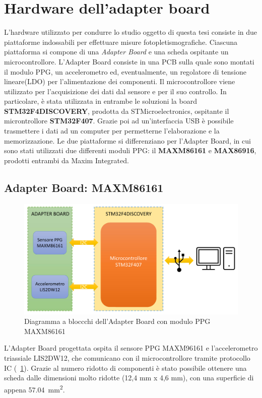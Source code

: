 \section{Hardware dell'adapter board}
L'hardware utilizzato per condurre lo studio oggetto di questa tesi consiste in due piattaforme indossabili per effettuare misure fotopletismografiche. Ciascuna piattaforma si compone di una \textit{Adapter Board} e una scheda ospitante un microcontrollore. L'Adapter Board consiste in una PCB sulla quale sono montati il modulo PPG, un accelerometro ed, eventualmente, un regolatore di tensione lineare(LDO) per l'alimentazione dei componenti. Il microcontrollore viene utilizzato per l'acquisizione dei dati dal sensore e per il suo controllo. In particolare, è stata utilizzata in entrambe le soluzioni la board \textbf{STM32F4DISCOVERY}, prodotta da STMicroelectronics, ospitante il microntrollore \textbf{STM32F407}. Grazie poi ad un'interfaccia USB è possibile trasmettere i dati ad un computer per permetterne l'elaborazione e la memorizzazione.
Le due piattaforme si differenziano per l'Adapter Board, in cui sono stati utilizzati due differenti moduli PPG: il \textbf{MAXM86161} e \textbf{MAX86916}, prodotti entrambi da Maxim Integrated.
\subsection{Adapter Board: MAXM86161}
\begin{figure}[b]
	\centering
	\includegraphics[width=0.6\linewidth]{ImageFiles/Hardware/DiagrammaBlocchiMAXM86161}
	\caption{Diagramma a bloccchi dell'Adapter Board con modulo PPG MAXM86161}
	\label{fig:DiagrammaBlocchiMAXM86161}
\end{figure}
L'Adapter Board progettata ospita il sensore PPG MAXM96161 e l'accelerometro triassiale LIS2DW12, che comunicano con il microcontrollore tramite protocollo IC (\Fig~\ref{fig:DiagrammaBlocchiMAXM86161}). Grazie al numero ridotto di componenti è stato possibile ottenere una scheda dalle dimensioni molto ridotte (12,4 mm x 4,6 mm), con una superficie di appena \SI{57.04}{\square\milli\meter}.

